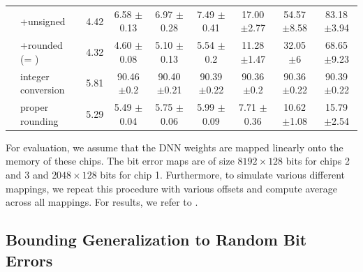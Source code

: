 \begin{table}[t]
\begin{tabular}{| c | l | c | c | c | c | c | c | c |}
		& +unsigned & 4.42 & 6.58 {\color{gray}\scriptsize ${\pm}$0.13} & 6.97 {\color{gray}\scriptsize ${\pm}$0.28} & 7.49 {\color{gray}\scriptsize ${\pm}$0.41} & 17.00 {\color{gray}\scriptsize ${\pm}$2.77} & 54.57 {\color{gray}\scriptsize ${\pm}$8.58} & 83.18 {\color{gray}\scriptsize ${\pm}$3.94}\\
		& +rounded (= \Quant) & 4.32 & 4.60 {\color{gray}\scriptsize ${\pm}$0.08} & 5.10 {\color{gray}\scriptsize ${\pm}$0.13} & 5.54 {\color{gray}\scriptsize ${\pm}$0.2} & 11.28 {\color{gray}\scriptsize ${\pm}$1.47} & 32.05 {\color{gray}\scriptsize ${\pm}$6} & 68.65 {\color{gray}\scriptsize ${\pm}$9.23}\\
		\hline
		\hline
		\multirow{2}{*}{\rotatebox{90}{$4$ bit}} & integer conversion & 5.81 & 90.46 {\color{gray}\scriptsize ${\pm}$0.2} & 90.40 {\color{gray}\scriptsize ${\pm}$0.21} & 90.39 {\color{gray}\scriptsize ${\pm}$0.22} & 90.36 {\color{gray}\scriptsize ${\pm}$0.2} & 90.36 {\color{gray}\scriptsize ${\pm}$0.22} & 90.39 {\color{gray}\scriptsize ${\pm}$0.22}\\
		& proper rounding & 5.29 & 5.49 {\color{gray}\scriptsize ${\pm}$0.04} & 5.75 {\color{gray}\scriptsize ${\pm}$0.06} & 5.99 {\color{gray}\scriptsize ${\pm}$0.09} & 7.71 {\color{gray}\scriptsize ${\pm}$0.36} & 10.62 {\color{gray}\scriptsize ${\pm}$1.08} & 15.79 {\color{gray}\scriptsize ${\pm}$2.54}\\
		\hline
	\end{tabular}
	\vspace*{-0.1cm} 
\end{table}

For evaluation, we assume that the DNN weights are mapped linearly onto the memory of these chips. The bit error maps are of size $8192 \times 128$ bits for chips 2 and 3 and $2048 \times 128$ bits for chip 1. Furthermore, to simulate various different mappings, we repeat this procedure with various offsets and compute average \RTE across all mappings. For results, we refer to .

\subsection{Bounding Generalization to Random Bit Errors}
\label{subsec:supp-bound}


